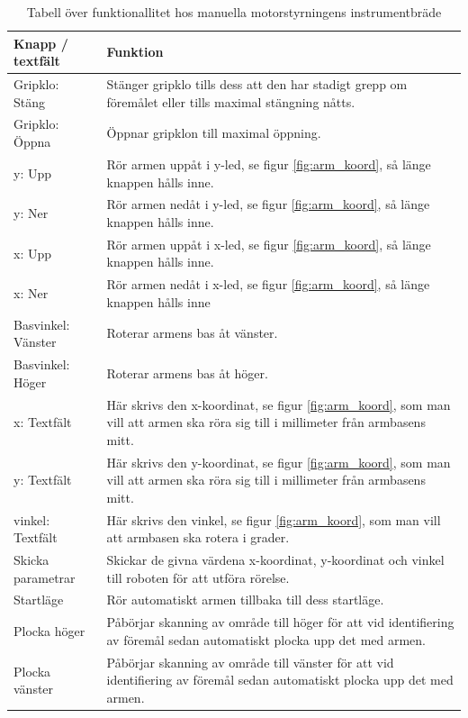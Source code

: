 \documentclass[a4paper,12pt]{article}
\begin{document}
\begin{table}[H]
    \centering
    \begin{tabularx}{\textwidth}{|l|X|}
        \hline \textbf{Knapp / textfält} & \textbf{Funktion} \\ \hline
        Gripklo: Stäng& Stänger gripklo tills dess att den har stadigt grepp om föremålet eller tills maximal stängning nåtts. \\ \hline
        Gripklo: Öppna& Öppnar gripklon till maximal öppning. \\ \hline
        y: Upp & Rör armen uppåt i y-led, se figur \ref{fig:arm_koord}, så länge knappen hålls inne. \\ \hline
        y: Ner & Rör armen nedåt i y-led, se figur \ref{fig:arm_koord}, så länge knappen hålls inne. \\ \hline
        x: Upp & Rör armen uppåt i x-led, se figur \ref{fig:arm_koord}, så länge knappen hålls inne. \\ \hline
        x: Ner & Rör armen nedåt i x-led, se figur \ref{fig:arm_koord}, så länge knappen hålls inne \\ \hline
        Basvinkel: Vänster & Roterar armens bas åt vänster. \\ \hline
        Basvinkel: Höger & Roterar armens bas åt höger. \\ \hline
        x: Textfält & Här skrivs den x-koordinat, se figur \ref{fig:arm_koord}, som man vill att armen ska röra sig till i millimeter från armbasens mitt. \\ \hline
        y: Textfält & Här skrivs den y-koordinat, se figur \ref{fig:arm_koord}, som man vill att armen ska röra sig till i millimeter från armbasens mitt. \\ \hline
        vinkel: Textfält & Här skrivs den vinkel, se figur \ref{fig:arm_koord}, som man vill att armbasen ska rotera i grader. \\ \hline
        Skicka parametrar & Skickar de givna värdena x-koordinat, y-koordinat och vinkel till roboten för att utföra rörelse. \\ \hline
        Startläge & Rör automatiskt armen tillbaka till dess startläge. \\ \hline
        Plocka höger & Påbörjar skanning av område till höger för att vid identifiering av föremål sedan automatiskt plocka upp det med armen. \\ \hline
        Plocka vänster & Påbörjar skanning av område till vänster för att vid identifiering av föremål sedan automatiskt plocka upp det med armen. \\ \hline
    \end{tabularx}
\caption{Tabell över funktionallitet hos manuella motorstyrningens instrumentbräde}
\label{tab:arm}
\end{table}
\end{document}

